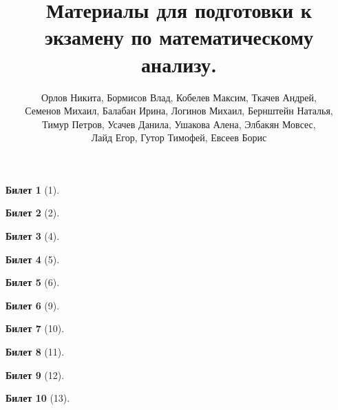 \documentclass[a4paper,12pt]{article}
\newtheorem*{ticket}{Билет}
\begin{document}
	\title{Материалы для подготовки к экзамену по математическому анализу.}
	\author{
		Орлов Никита,
		Бормисов Влад,
		Кобелев Максим,
		Ткачев Андрей,\\
		Семенов Михаил,
		Балабан Ирина,
		Логинов Михаил,
		Бернштейн Наталья,\\
		Тимур Петров, 
		Усачев Данила,
		Ушакова Алена,
		Элбакян Мовсес,\\
		Лайд Егор, 
		Гутор Тимофей,
		Евсеев Борис
		}
	\maketitle
	
	\begin{ticket}[1]
		
		\newpage
	\end{ticket}
	
	\begin{ticket}[2]
		
		\newpage
	\end{ticket}
	
	
	\begin{ticket}[4]
		
		\newpage
	\end{ticket}
	
	\begin{ticket}[5]
		
		\newpage
	\end{ticket}
	
	\begin{ticket}[6]
		
		\newpage
	\end{ticket}
	
	\begin{ticket}[9]
		
		\newpage
	\end{ticket}
	
	\begin{ticket}[10]
		
		\newpage
	\end{ticket}
	
	\begin{ticket}[11]
		
		\newpage
	\end{ticket}
	
	\begin{ticket}[12]
		
		\newpage
	\end{ticket}
	
	\begin{ticket}[13]
		
		\newpage
	\end{ticket}
	
\end{document}

